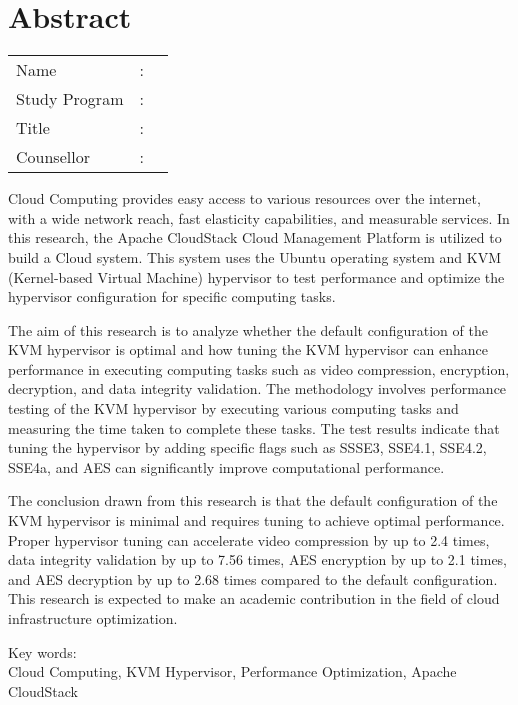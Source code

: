 %
%
%

\chapter*{Abstract}

\vspace*{0.2cm}
{
	\setlength{\parindent}{0pt}
	
	\begin{tabular}{@{}l l p{10cm}}
		Name&: & \penulis \\
		Study Program&: & \program \\
		Title&: & \judulInggris \\
		Counsellor&: & \pembimbing \\
	\end{tabular}

	\bigskip
	\bigskip

	Cloud Computing provides easy access to various resources over the internet, with a wide network reach, fast elasticity capabilities, and measurable services. In this research, the Apache CloudStack Cloud Management Platform is utilized to build a Cloud system. This system uses the Ubuntu operating system and KVM (Kernel-based Virtual Machine) hypervisor to test performance and optimize the hypervisor configuration for specific computing tasks.
	
	The aim of this research is to analyze whether the default configuration of the KVM hypervisor is optimal and how tuning the KVM hypervisor can enhance performance in executing computing tasks such as video compression, encryption, decryption, and data integrity validation. The methodology involves performance testing of the KVM hypervisor by executing various computing tasks and measuring the time taken to complete these tasks. The test results indicate that tuning the hypervisor by adding specific flags such as SSSE3, SSE4.1, SSE4.2, SSE4a, and AES can significantly improve computational performance.
	
	The conclusion drawn from this research is that the default configuration of the KVM hypervisor is minimal and requires tuning to achieve optimal performance. Proper hypervisor tuning can accelerate video compression by up to 2.4 times, data integrity validation by up to 7.56 times, AES encryption by up to 2.1 times, and AES decryption by up to 2.68 times compared to the default configuration. This research is expected to make an academic contribution in the field of cloud infrastructure optimization.

	\bigskip

	Key words:\\
	Cloud Computing, KVM Hypervisor, Performance Optimization, Apache CloudStack
}

\newpage